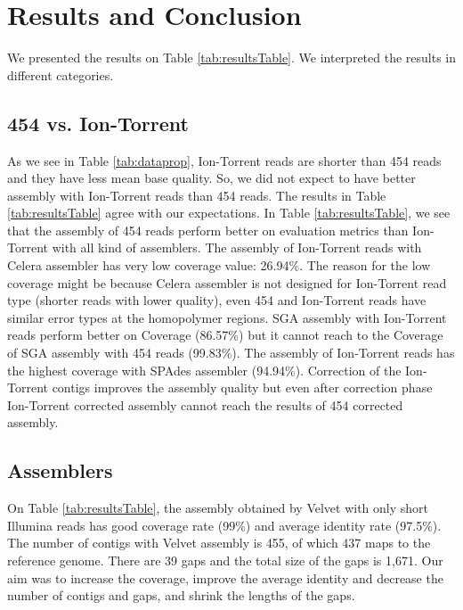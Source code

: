 \documentclass{llncs}
\begin{document}
\section{Results and Conclusion}
We presented the results on Table \ref{tab:resultsTable}. We interpreted the results in different categories. 

\subsection{454 vs. Ion-Torrent}
\label{454Ion}
As we see in Table \ref{tab:dataprop}, Ion-Torrent reads are shorter than 454 reads and they have less mean base quality. So, we did not expect to have better assembly with Ion-Torrent reads than 454 reads. The results in Table \ref{tab:resultsTable} agree with our expectations.
In Table \ref{tab:resultsTable}, we see that the assembly of 454 reads perform better on evaluation metrics than Ion-Torrent with all kind of assemblers. The assembly of Ion-Torrent reads with Celera assembler has very low coverage value: 26.94\%. The reason for the low coverage might be because Celera assembler is not designed for Ion-Torrent read type (shorter reads with lower quality), even 454 and Ion-Torrent reads have similar error types at the homopolymer regions. SGA assembly with Ion-Torrent reads perform better on Coverage (86.57\%) but it cannot reach to the Coverage of SGA assembly with 454 reads (99.83\%). The assembly of Ion-Torrent reads has the highest coverage with SPAdes assembler (94.94\%). Correction of the Ion-Torrent contigs improves the assembly quality but even after correction phase Ion-Torrent corrected assembly cannot reach the results of 454 corrected assembly. 

\subsection{Assemblers}

On Table \ref{tab:resultsTable}, the assembly obtained by Velvet with only short Illumina reads has good coverage rate (99\%) and average identity rate (97.5\%). The number of contigs with Velvet assembly is 455, of which 437 maps to the reference genome. There are 39 gaps and the total size of the gaps is 1,671. Our aim was to increase the coverage, improve the average identity and decrease the number of contigs and gaps, and shrink the lengths of the gaps.
\end{document}
